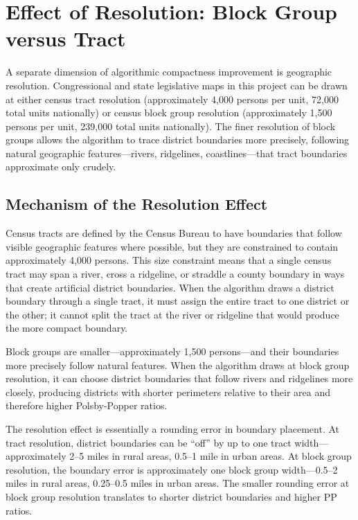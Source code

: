 \section{Effect of Resolution: Block Group versus Tract}
\label{sec:resolution}

A separate dimension of algorithmic compactness improvement is geographic resolution. Congressional and state legislative maps in this project can be drawn at either census tract resolution (approximately 4,000 persons per unit, 72,000 total units nationally) or census block group resolution (approximately 1,500 persons per unit, 239,000 total units nationally). The finer resolution of block groups allows the algorithm to trace district boundaries more precisely, following natural geographic features---rivers, ridgelines, coastlines---that tract boundaries approximate only crudely.

\subsection{Mechanism of the Resolution Effect}

Census tracts are defined by the Census Bureau to have boundaries that follow visible geographic features where possible, but they are constrained to contain approximately 4,000 persons. This size constraint means that a single census tract may span a river, cross a ridgeline, or straddle a county boundary in ways that create artificial district boundaries. When the algorithm draws a district boundary through a single tract, it must assign the entire tract to one district or the other; it cannot split the tract at the river or ridgeline that would produce the more compact boundary.

Block groups are smaller---approximately 1,500 persons---and their boundaries more precisely follow natural features. When the algorithm draws at block group resolution, it can choose district boundaries that follow rivers and ridgelines more closely, producing districts with shorter perimeters relative to their area and therefore higher Polsby-Popper ratios.

The resolution effect is essentially a rounding error in boundary placement. At tract resolution, district boundaries can be ``off'' by up to one tract width---approximately 2--5 miles in rural areas, 0.5--1 mile in urban areas. At block group resolution, the boundary error is approximately one block group width---0.5--2 miles in rural areas, 0.25--0.5 miles in urban areas. The smaller rounding error at block group resolution translates to shorter district boundaries and higher PP ratios.


